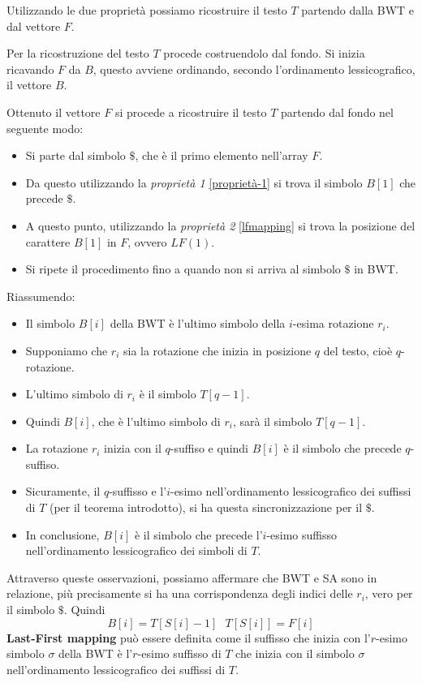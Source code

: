 Utilizzando le due proprietà possiamo ricostruire il testo $T$ partendo dalla
BWT e dal vettore $F$.
\begin{esempio} 
    Per la ricostruzione del testo $T$ procede costruendolo dal fondo. Si inizia
    ricavando $F$ da $B$, questo avviene ordinando, secondo l'ordinamento
    lessicografico, il vettore $B$.

    Ottenuto il vettore $F$ si procede a ricostruire il testo $T$ partendo dal
    fondo nel seguente modo:
    \begin{itemize}
        \item Si parte dal simbolo $\$$, che è il primo elemento nell'array $F$.
        \item Da questo utilizzando la \textit{proprietà 1} \ref{proprietà-1} si
              trova il simbolo $B[1]$ che precede $\$$.
        \item A questo punto, utilizzando la \textit{proprietà 2} \ref{lfmapping}
              si trova la posizione del carattere $B[1]$ in $F$, ovvero $LF(1)$.
        \item Si ripete il procedimento fino a quando non si arriva al simbolo
              $\$$ in BWT.
    \end{itemize}
\end{esempio}
Riassumendo:
\begin{itemize}
    \item Il simbolo $B[i]$ della BWT è l'ultimo simbolo della $i$-esima rotazione
          $r_i$.
    \item Supponiamo che $r_i$ sia la rotazione che inizia in posizione $q$ del
          testo, cioè $q$-rotazione.
    \item L'ultimo simbolo di $r_i$ è il simbolo $T[q - 1]$.
    \item Quindi $B[i]$, che è l'ultimo simbolo di $r_i$, sarà il simbolo $T[q - 1]$.
    \item La rotazione $r_i$ inizia con il $q$-suffiso e quindi $B[i]$ è il simbolo
          che precede $q$-suffiso.
    \item Sicuramente, il $q$-suffisso e l'$i$-esimo nell'ordinamento lessicografico
          dei suffissi di $T$ (per il teorema introdotto), si ha questa
          sincronizzazione per il $\$$. %
    \item In conclusione, $B[i]$ è il simbolo che precede l'$i$-esimo suffisso
          nell'ordinamento lessicografico dei simboli di $T$.
\end{itemize}
Attraverso queste osservazioni, possiamo affermare che BWT e SA sono in relazione,
più precisamente si ha una corrispondenza degli indici delle $r_i$, vero per il
simbolo $\$$. Quindi
\begin{equation}
    B[i] = T[S[i]-1] \ \ \ T[S[i]] = F[i]
\end{equation}
\textbf{Last-First mapping} può essere definita come il suffisso che inizia con
l'$r$-esimo simbolo $\sigma$ della BWT è l'$r$-esimo suffisso di $T$ che inizia
con il simbolo $\sigma$ nell'ordinamento lessicografico dei suffissi di $T$.

